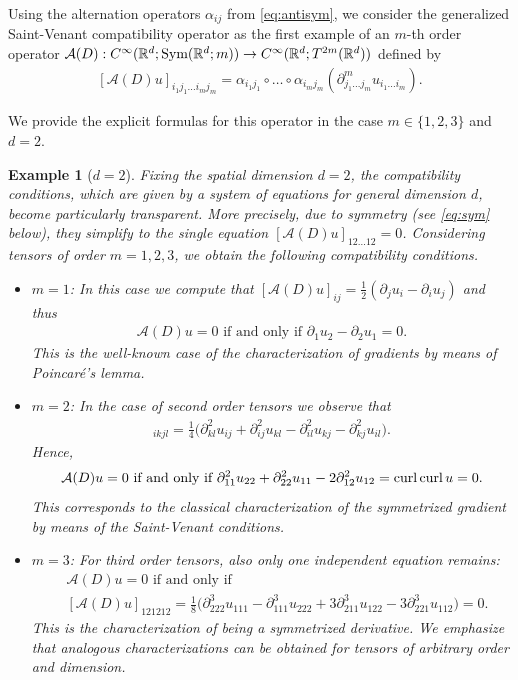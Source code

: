 \documentclass[a4paper, 10pt, twoside, notitlepage]{amsart}
\theoremstyle{plain}
\newtheorem{example}[prop]{Example}
\newcommand{\R}{\mathbb{R}}
\newcommand{\p}{\partial}
\newcommand{\A}{\mathcal{A}}
\renewcommand{\S}[1]{\textup{Sym}(\R^d;#1)}
\begin{document}
	
	Using the alternation operators $\alpha_{i j}$ from \eqref{eq:antisym}, we consider the generalized Saint-Venant compatibility operator as the first example of an $m$-th order operator $\A(D): C^\infty(\R^d;\S{m}) \to C^\infty(\R^d;T^{2m}(\R^d))$ defined by
	\begin{align} \label{eq:Operator} [\A(D) u]_{i_1j_1 \dots i_m j_m} = \alpha_{i_1 j_1} \circ \dots \circ \alpha_{i_m j_m} (\p^m_{j_1 \dots j_m} u_{i_1 \dots i_m}).
	\end{align}

We provide the explicit formulas for this operator in the case $m\in \{1,2,3\}$ and $d=2$.	
	
	\begin{example}[$d=2$]\label{ex:d-and-m}
		Fixing the spatial dimension $d=2$, the compatibility conditions, which are given by a system of equations for general dimension $d$, become particularly transparent. More precisely, due to
		symmetry (see \eqref{eq:sym} below), they simplify to the single equation $[\A(D)u]_{12\dots12} = 0$. Considering tensors of order $m=1,2,3$, we obtain the following compatibility conditions.
		\begin{itemize}
			\item \underline{$m=1$}: In this case we compute that $[\A(D)u]_{ij} =\frac{1}{2}( \p_j u_i - \p_i u_j)$ and thus
			\begin{align*}
				\A(D)u = 0 \text{ if and only if } \p_1 u_2 - \p_2 u_1 = 0.
			\end{align*}
			This is the well-known case of the characterization of gradients by means of Poincar\'e's lemma.
			\item \underline{$m=2$}: In the case of second order tensors we observe that
			\begin{align*} [\A(D)u]_{ikjl} = \frac{1}{4} \big( \p^2_{kl} u_{ij} + \p^2_{ij} u_{kl} - \p^2_{il} u_{kj} - \p^2_{kj} u_{il} \big).
			\end{align*}
			Hence,
			\begin{align*}
				\A(D)u = 0 \text{ if and only if } \p^2_{11} u_{22} + \p^2_{22} u_{11} - 2 \p^2_{12}u_{12} = \curl \curl u = 0.
			\end{align*}
			This corresponds to the classical characterization of the symmetrized gradient by means of the Saint-Venant conditions.
			\item \underline{$m=3$}: For third order tensors, also only one independent equation remains:
			\begin{align*}
				&\A(D)u = 0 \text{ if and only if } \\
				&[\A(D)u]_{121212} = \frac{1}{8} \big( \p^3_{222} u_{111} - \p^3_{111} u_{222} + 3 \p^3_{211} u_{122} - 3 \p^3_{221} u_{112}\big) = 0.
			\end{align*}
			This is the characterization of being a symmetrized derivative. We emphasize that analogous characterizations can be obtained for tensors of arbitrary order and dimension.
		\end{itemize}
	\end{example}
	
\end{document}
